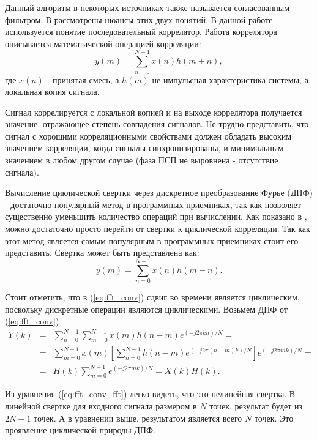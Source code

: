 Данный алгоритм в некоторых источниках также называется согласованным фильтром. В \cite{sklyar} рассмотрены нюансы этих двух понятий.
В данной работе используется понятие последовательный коррелятор. Работа коррелятора описывается математической операцией
корреляции:
\begin{equation}
	\label{eq:serial_corr}
	y(m)=\sum\limits_{n=0}^{N-1}{x(n)h(m+n)},
\end{equation}
где ${x(n)}$ - принятая смесь, а ${h(m)}$ не импульсная характеристика системы, а локальная копия сигнала.

Сигнал коррелируется с локальной копией и на выходе коррелятора получается значение, отражающее
степень совпадения сигналов. Не трудно представить, что сигнал с хорошими корреляционными свойствами должен обладать высоким значением
корреляции, когда сигналы синхронизированы, и минимальным значением в любом другом случае (фаза ПСП не выровнена - отсутствие сигнала).


Вычисление циклической свертки через дискретное преобразование Фурье (ДПФ) - достаточно популярный метод
в программных приемниках, так как позволяет существенно уменьшить количество операций при вычислении. Как показано
в \cite{tsui, oppenheim}, можно достаточно просто перейти от свертки к циклической корреляции. Так как этот метод является самым
популярным в программных приемниках стоит его представить.
Свертка может быть представлена как:
\begin{equation}
	\label{eq:fft_conv}
	y(m)=\sum\limits_{n=0}^{N-1}{x(n)h(m-n)}.
\end{equation}

Стоит отметить, что в (\ref{eq:fft_conv}) сдвиг во времени является циклическим, поскольку дискретные операции являются циклическими.
Возьмем ДПФ от (\ref{eq:fft_conv})
\begin{eqnarray}
	\label{eq:fft_conv_fft}
	Y(k) & = & \sum\limits_{n=0}^{N-1}\sum\limits_{m=0}^{N-1}{x(m)h(n-m)e^{(-j2\pi{kn})/N}}=\nonumber \\
	& = & \sum\limits_{m=0}^{N-1}{x(m)}[\sum\limits_{n=0}^{N-1}h(n-m)e^{(-j2\pi{(n-m)}k)/N}]e^{(-j2\pi{m}k)/N}=\\
	& = & H(k)\sum\limits_{m=0}^{N-1}e^{(-j2\pi{m}k)/N} = X(k)H(k)\nonumber.
\end{eqnarray}

Из уравнения (\ref{eq:fft_conv_fft}) легко видеть, что это нелинейная свертка. В линейной свертке для входного сигнала размером в ${N}$ точек,
результат будет из ${2N-1}$ точек. А в уравнении выше, результатом является всего ${N}$ точек.
Это проявление циклической природы ДПФ.

